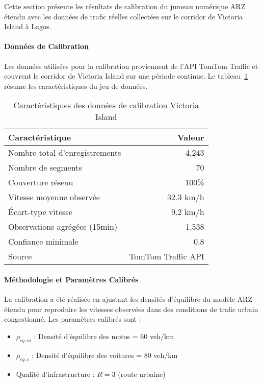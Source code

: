 Cette section présente les résultats de calibration du jumeau numérique ARZ étendu
avec les données de trafic réelles collectées sur le corridor de Victoria Island à Lagos.

\paragraph{Données de Calibration}

Les données utilisées pour la calibration proviennent de l'API TomTom Traffic et couvrent
le corridor de Victoria Island sur une période continue. Le tableau~\ref{tab:data_quality_74}
résume les caractéristiques du jeu de données.

\begin{table}[h]
    \centering
    \caption{Caractéristiques des données de calibration Victoria Island}
    \label{tab:data_quality_74}
    \begin{tabular}{|l|r|}
        \hline
        \textbf{Caractéristique}       & \textbf{Valeur}    \\
        \hline
        Nombre total d'enregistrements & 4,243              \\
        Nombre de segments             & 70                 \\
        Couverture réseau              & 100\%              \\
        Vitesse moyenne observée       & 32.3 km/h          \\
        Écart-type vitesse             & 9.2 km/h           \\
        Observations agrégées (15min)  & 1,538              \\
        Confiance minimale             & 0.8                \\
        Source                         & TomTom Traffic API \\
        \hline
    \end{tabular}
\end{table}

\paragraph{Méthodologie et Paramètres Calibrés}

La calibration a été réalisée en ajustant les densités d'équilibre du modèle ARZ étendu
pour reproduire les vitesses observées dans des conditions de trafic urbain congestionné.
Les paramètres calibrés sont :

\begin{itemize}
    \item $\rho_{eq,m}$ : Densité d'équilibre des motos = 60 veh/km
    \item $\rho_{eq,c}$ : Densité d'équilibre des voitures = 80 veh/km
    \item Qualité d'infrastructure : $R = 3$ (route urbaine)
\end{itemize}

